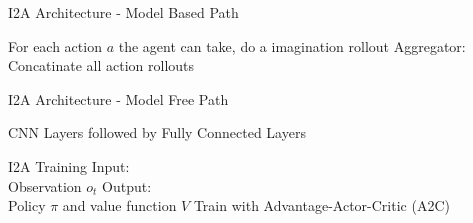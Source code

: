  
I2A Architecture - Model Based Path 
 
 
       For each action $a$ the agent can take, do a imagination rollout  
     Aggregator: \\ 
    Concatinate all action rollouts 
   
 
 
 
I2A Architecture - Model Free Path 
 
 
 
CNN Layers followed by Fully Connected Layers 
 
 
 
I2A Training 
Input:\\ 
    Observation $o_t$ 
     Output:\\ 
    Policy $\pi$ and value function $V$ 
     Train with Advantage-Actor-Critic (A2C) 

